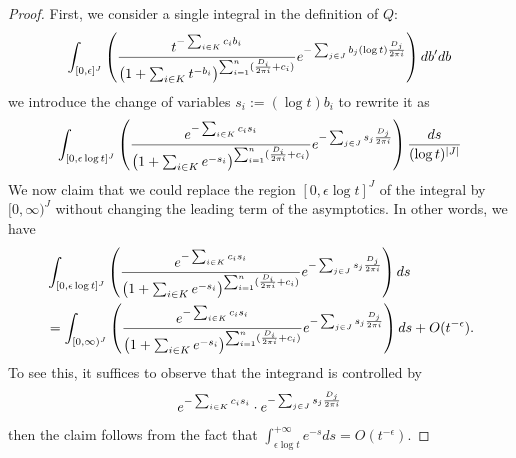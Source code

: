 \documentclass[10pt,a4paper]{amsart}
\begin{document}
\begin{proof}

First, we consider a single integral in the definition of $Q$:
\begin{align*}
	\int_{[0,\epsilon]^J}\left(\frac{t^{-\sum_{i\in K}c_ib_i}}{\left(1+\sum_{i\in K}t^{-b_i}\right)^{\sum_{i=1}^n(\frac{D_i}{2\pi{\rm i}}+c_i)}}e^{-\sum_{j\in J}b_j (\log t)\frac{D_j}{2\pi{\rm i}}}\right)db^{\prime}db
\end{align*}
we introduce the change of variables $s_i:=(\log t)b_i$ to rewrite it as
\begin{align*}
	\int_{[0,\epsilon\log t]^J}\left(\frac{e^{-\sum_{i\in K}c_is_i}}{\left(1+\sum_{i\in K}e^{-s_i}\right)^{\sum_{i=1}^n(\frac{D_i}{2\pi{\rm i}}+c_i)}}e^{-\sum_{j\in J}s_j \frac{D_j}{2\pi{\rm i}}}\right)\frac{ds}{(\log t)^{|J|}}
\end{align*}
We now claim that we could replace the region $[0,\epsilon\log t]^J$ of the integral by $[0,\infty)^J$ without changing the leading term of the asymptotics. In other words, we have
	\begin{align*}
	&\int_{[0,\epsilon\log t]^J}\left(\frac{e^{-\sum_{i\in K}c_is_i}}{\left(1+\sum_{i\in K}e^{-s_i}\right)^{\sum_{i=1}^n(\frac{D_i}{2\pi{\rm i}}+c_i)}}e^{-\sum_{j\in J}s_j \frac{D_j}{2\pi{\rm i}}}\right)ds \\
	&=\int_{[0,\infty)^J}\left(\frac{e^{-\sum_{i\in K}c_is_i}}{\left(1+\sum_{i\in K}e^{-s_i}\right)^{\sum_{i=1}^n(\frac{D_i}{2\pi{\rm i}}+c_i)}}e^{-\sum_{j\in J}s_j \frac{D_j}{2\pi{\rm i}}}\right)ds + O(t^{-\epsilon}).
\end{align*}
	To see this, it suffices to observe that the integrand is controlled by 
	\begin{align*}
		e^{-\sum_{i\in K}c_is_i}\cdot e^{-\sum_{j\in J}s_j \frac{D_j}{2\pi{\rm i}}} 
	\end{align*}
	then the claim follows from the fact that $\int_{\epsilon\log t}^{+\infty}e^{-s}ds = O(t^{-\epsilon})$.
	
	\smallskip



\end{proof}
\end{document}
